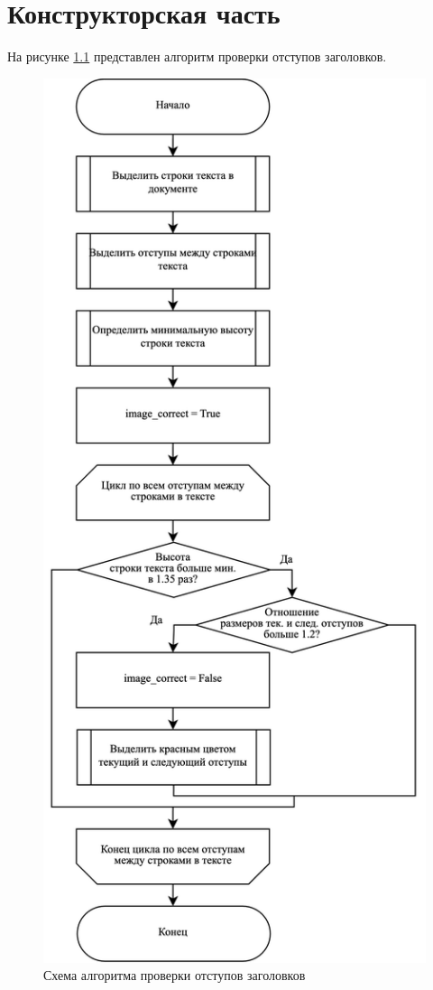 \chapter{Конструкторская часть}

На рисунке \ref{img:algo} представлен алгоритм проверки отступов заголовков.

\begin{figure}
	\centering
	\includegraphics[height=0.95\textheight]{images/algo.png}
	\caption{Схема алгоритма проверки отступов заголовков}
	\label{img:algo}
\end{figure}



\clearpage
